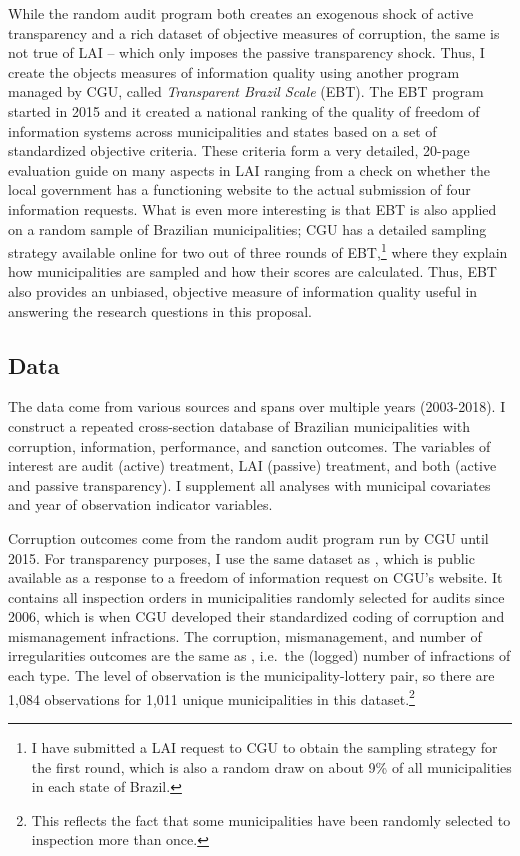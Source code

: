 \documentclass[11pt]{article}
\begin{document}
While the random audit program both creates an exogenous shock of active transparency and a rich dataset of objective measures of corruption, the same is not true of LAI -- which only imposes the passive transparency shock. Thus, I create the objects measures of information quality using another program managed by CGU, called \emph{Transparent Brazil Scale} (EBT). The EBT program started in 2015 and it created a national ranking of the quality of freedom of information systems across municipalities and states based on a set of standardized objective criteria. These criteria form a very detailed, 20-page evaluation guide on many aspects in LAI ranging from a check on whether the local government has a functioning website to the actual submission of four information requests. What is even more interesting is that EBT is also applied on a random sample of Brazilian municipalities; CGU has a detailed sampling strategy available online for two out of three rounds of EBT,\footnote{I have submitted a LAI request to CGU to obtain the sampling strategy for the first round, which is also a random draw on about 9\% of all municipalities in each state of Brazil.} where they explain how municipalities are sampled and how their scores are calculated. Thus, EBT also provides an unbiased, objective measure of information quality useful in answering the research questions in this proposal.

\subsection{Data} \label{subsec:data_paper3}

The data come from various sources and spans over multiple years (2003-2018). I construct a repeated cross-section database of Brazilian municipalities with corruption, information, performance, and sanction outcomes. The variables of interest are audit (active) treatment, LAI (passive) treatment, and both (active and passive transparency). I supplement all analyses with municipal covariates and year of observation indicator variables.

Corruption outcomes come from the random audit program run by CGU until 2015. For transparency purposes, I use the same dataset as \citet{AvisGovernmentAuditsReduce2018}, which is public available as a response to a freedom of information request on CGU's website. It contains all inspection orders in municipalities randomly selected for audits since 2006, which is when CGU developed their standardized coding of corruption and mismanagement infractions. The corruption, mismanagement, and number of irregularities outcomes are the same as \citet{AvisGovernmentAuditsReduce2018}, i.e.~the (logged) number of infractions of each type. The level of observation is the municipality-lottery pair, so there are 1,084 observations for 1,011 unique municipalities in this dataset.\footnote{This reflects the fact that some municipalities have been randomly selected to inspection more than once.}
\end{document}
